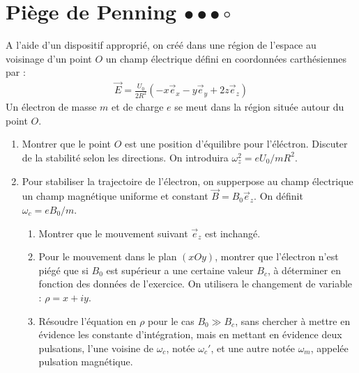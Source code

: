 \newpage

\section{Piège de Penning $\bullet\bullet\bullet\circ$}

A l'aide d'un dispositif approprié, on créé dans une région de l'espace au voisinage d'un point $O$ un champ électrique défini en coordonnées carthésiennes par :
\begin{align*}
	\vec{E}=\frac{U_0}{2R^2}\left(-x\vec{e}_x-y\vec{e}_y+2z\vec{e}_z \right) 
\end{align*}
Un électron de masse $m$ et de charge $e$ se meut dans la région située autour du point $O$.

\begin{enumerate}

	\item Montrer que le point $O$ est une position d'équilibre pour l'éléctron. Discuter de la stabilité selon les directions. On introduira $\omega_z^2=eU_0/mR^2$.

 \item Pour stabiliser la trajectoire de l'électron, on supperpose au champ électrique un champ magnétique uniforme et constant $\vec{B}=B_0\vec{e}_z$. On définit $\omega_c=eB_0/m$. 

\begin{enumerate}

		\item Montrer que le mouvement suivant $\vec{e}_z$ est inchangé.
		
		\item Pour le mouvement dans le plan $(xOy)$, montrer que l'électron n'est piégé que si $B_0$ est supérieur a une certaine valeur $B_c$, à déterminer en fonction des données de l'exercice. On utilisera le changement de variable : $\rho = x+iy$.
		
		\item Résoudre l'équation en $\rho$ pour le cas $B_0\gg B_c$, sans chercher à mettre en évidence les constante d'intégration, mais en mettant en évidence deux pulsations, l'une voisine de $\omega_c$, notée $\omega_c'$, et une autre notée $\omega_m$, appelée pulsation magnétique. 

\end{enumerate}
		
\end{enumerate}

\newpage

